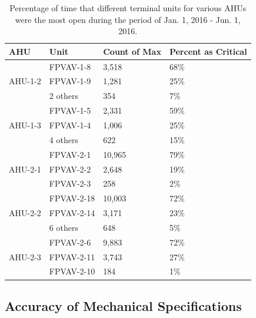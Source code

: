 \begin{table}
\centering
\caption{Percentage of time that different terminal units for various AHUs were the most open during the period of Jan. 1, 2016 - Jun. 1, 2016.}
\label{tab:AHU12CriticalZone}
\begin{tabular}{@{}llll@{}}
\toprule
AHU                        & Unit       & Count of Max & Percent as Critical \\ \midrule
\multirow{3}{*}{AHU-1-2}   & FPVAV-1-8  & 3,518        & 68\%                \\
                           & FPVAV-1-9  & 1,281        & 25\%                \\
                           & 2 others   & 354          & 7\%                 \\ \midrule
\multirow{3}{*}{AHU-1-3}   & FPVAV-1-5  & 2,331        & 59\%                \\
                           & FPVAV-1-4  & 1,006        & 25\%                \\
                           & 4 others   & 622          & 15\%                \\ \midrule
\multirow{3}{*}{AHU-2-1}   & FPVAV-2-1  & 10,965       & 79\%                \\
                           & FPVAV-2-2  & 2,648        & 19\%                \\
                           & FPVAV-2-3  & 258          & 2\%                 \\ \midrule
\multirow{3}{*}{AHU-2-2}   & FPVAV-2-18 & 10,003       & 72\%                \\
                           & FPVAV-2-14 & 3,171        & 23\%                \\
                           & 6 others   & 648          & 5\%                 \\ \midrule
\multirow{3}{*}{AHU-2-3}   & FPVAV-2-6  & 9,883        & 72\%                \\
                           & FPVAV-2-11 & 3,743        & 27\%                \\
                           & FPVAV-2-10 & 184          & 1\%                 \\ \midrule
\end{tabular}
\end{table}


\subsection{Accuracy of Mechanical Specifications}

